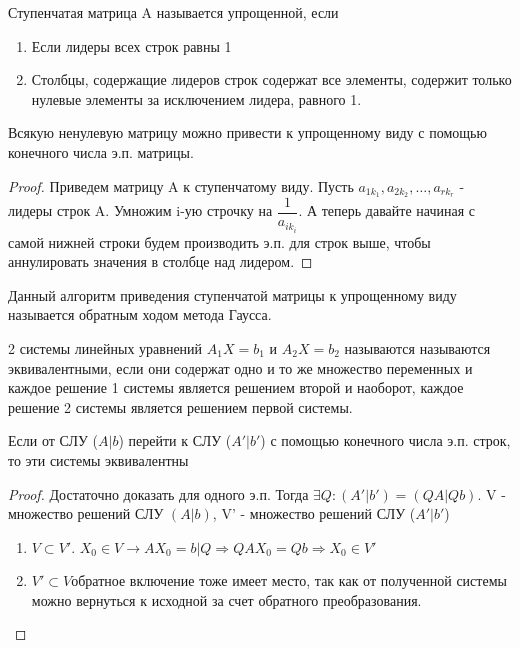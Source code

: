 \begin{definition}
	Ступенчатая матрица A называется упрощенной, если 
	\begin{enumerate}
		\item Если лидеры всех строк равны 1
		\item Столбцы, содержащие лидеров строк содержат все элементы, содержит только нулевые элементы за исключением лидера, равного 1.
	\end{enumerate}
\end{definition}
\begin{theorem}
	Всякую ненулевую матрицу можно привести к упрощенному виду с помощью конечного числа э.п. матрицы.
\end{theorem}
\begin{proof}
	Приведем матрицу A к ступенчатому виду. Пусть \(a_{1k_1}, a_{2k_2}, \ldots, a_{rk_r}\) - лидеры строк A. Умножим i-ую строчку на \(\dfrac{1}{a_{ik_i}}\). А теперь давайте начиная с самой нижней строки будем производить э.п. для строк выше, чтобы аннулировать значения в столбце над лидером. 
\end{proof}
\begin{note}
	Данный алгоритм приведения ступенчатой матрицы к упрощенному виду называется обратным ходом метода Гаусса.
\end{note}
\begin{definition}
	2 системы линейных уравнений \(A_1X = b_1\) и \(A_2X = b_2\) называются называются эквивалентными, если они содержат одно и то же множество переменных и каждое решение 1 системы является решением второй и наоборот, каждое решение 2 системы является решением первой системы.
\end{definition}
\begin{theorem}
	Если от СЛУ (\(A|b\)) перейти к СЛУ (\(A'|b'\)) с помощью конечного числа э.п. строк, то эти системы эквивалентны
\end{theorem}
\begin{proof}
	Достаточно доказать для одного э.п. Тогда \(\exists Q: (A'|b') = (QA | Qb)\). V - множество решений СЛУ \((A|b)\), V' - множество решений СЛУ (\(A'|b'\))
	\begin{enumerate}
		\item \(V\subset V'\). \(X_0\in V\longrightarrow AX_0 = b | Q \Longrightarrow QAX_0 = Qb \Longrightarrow X_0\in V'\)
		\item \(V'\subset V\)обратное включение тоже имеет место, так как от полученной системы можно вернуться к исходной за счет обратного преобразования.
	\end{enumerate}
\end{proof}
